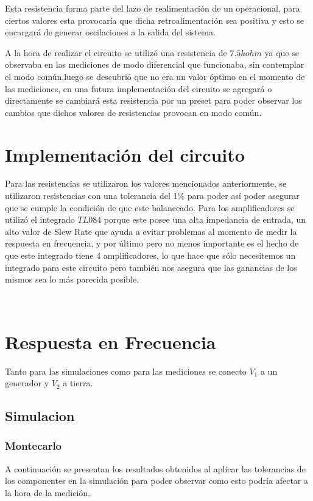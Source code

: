 \documentclass[11pt, a4paper]{article}
\begin{document}
	Esta resistencia forma parte del lazo de realimentación de un operacional, para ciertos valores esta provocaría que dicha retroalimentación sea positiva y esto se encargará de generar oscilaciones a la salida del sistema.
	
	A la hora de realizar el circuito se utilizó una resistencia de $7.5k\si{ohm}$ ya que se observaba en las mediciones de modo diferencial que funcionaba, sin contemplar el modo común,luego se descubrió que no era un valor óptimo en el momento de las mediciones, en una futura implementación del circuito se agregará o directamente se cambiará esta resistencia por un preset para poder observar los cambios que dichos valores de resistencias provocan en modo común.
	
\section{Implementación del circuito}
	Para las resistencias se utilizaron los valores mencionados anteriormente, se utilizaron resistencias con una tolerancia del 1$\%$ para poder así poder asegurar que se cumple la condición de que este balanceado.
	Para los amplificadores se utilizó el integrado $\mathit{TL084}$ porque este posee una alta impedancia de entrada, un alto valor de Slew Rate que ayuda a evitar problemas al momento de medir la respuesta en frecuencia, y por último pero no menos importante es el hecho de que este integrado tiene 4 amplificadores, lo que hace que sólo necesitemos un integrado para este circuito pero también nos asegura que las ganancias de los mismos sea lo más parecida posible.

\
\section{Respuesta en Frecuencia}
Tanto para las simulaciones como para las mediciones se conecto $V_1$ a un generador y $V_2$ a tierra.
\subsection{Simulacion}
\subsubsection{Montecarlo}

	A continuación se presentan los resultados obtenidos al aplicar las tolerancias de los componentes en la simulación para poder observar como esto podría afectar a la hora de la medición.
	
\end{document}
